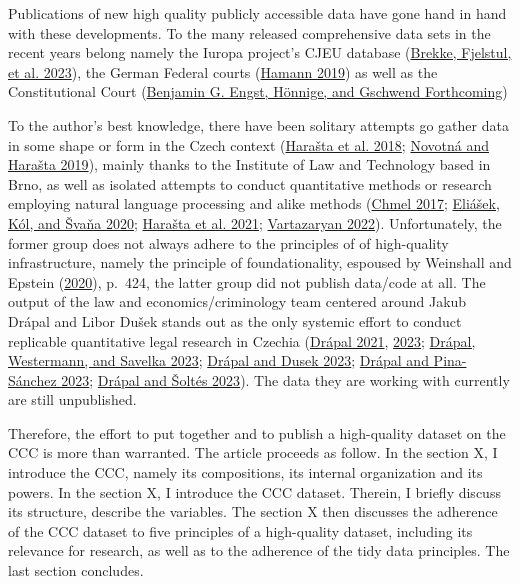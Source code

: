 \documentclass[
  11pt,
]{article}
\begin{document}
Publications of new high quality publicly accessible data have gone hand
in hand with these developments. To the many released comprehensive data
sets in the recent years belong namely the Iuropa project's CJEU
database (\protect\hyperlink{ref-brekkeCJEUDatabasePlatform2023}{Brekke,
Fjelstul, et al. 2023}), the German Federal courts
(\protect\hyperlink{ref-hamannGermanFederalCourts2019}{Hamann 2019}) as
well as the Constitutional Court
(\protect\hyperlink{ref-engstConstitutionalCourtDatabaseForthcoming}{Benjamin
G. Engst, Hönnige, and Gschwend Forthcoming})

To the author's best knowledge, there have been solitary attempts go
gather data in some shape or form in the Czech context
(\protect\hyperlink{ref-harastaAnnotatedCorpusCzech2018}{Harašta et al.
2018}; \protect\hyperlink{ref-novotnaCzechCourtDecisions2019}{Novotná
and Harašta 2019}), mainly thanks to the Institute of Law and Technology
based in Brno, as well as isolated attempts to conduct quantitative
methods or research employing natural language processing and alike
methods (\protect\hyperlink{ref-chmelZpravodajoveSenatyVliv2017}{Chmel
2017};
\protect\hyperlink{ref-eliasekAutomatickaKlasifikaceVyznamovych2020}{Eliášek,
Kól, and Švaňa 2020};
\protect\hyperlink{ref-harastaCitacniAnalyzaJudikatury2021}{Harašta et
al. 2021};
\protect\hyperlink{ref-vartazaryanSitOvaAnalyza2022}{Vartazaryan 2022}).
Unfortunately, the former group does not always adhere to the principles
of of high-quality infrastructure, namely the principle of
foundationality, espoused by Weinshall and Epstein
(\protect\hyperlink{ref-weinshallDevelopingHighQualityData2020}{2020}),
p.~424, the latter group did not publish data/code at all. The output of
the law and economics/criminology team centered around Jakub Drápal and
Libor Dušek stands out as the only systemic effort to conduct replicable
quantitative legal research in Czechia
(\protect\hyperlink{ref-drapalSentencingCzechRepublic2021}{Drápal 2021},
\protect\hyperlink{ref-drapalPunitiveNegligenceMyths2023}{2023};
\protect\hyperlink{ref-drapalUsingLargeLanguage2023}{Drápal, Westermann,
and Savelka 2023};
\protect\hyperlink{ref-drapalLawAuthorityHow2023}{Drápal and Dusek
2023}; \protect\hyperlink{ref-drapalWhatValueJudicial2023}{Drápal and
Pina-Sánchez 2023};
\protect\hyperlink{ref-drapalSentencingDecisionsQuantity2023}{Drápal and
Šoltés 2023}). The data they are working with currently are still
unpublished.

Therefore, the effort to put together and to publish a high-quality
dataset on the CCC is more than warranted. The article proceeds as
follow. In the section X, I introduce the CCC, namely its compositions,
its internal organization and its powers. In the section X, I introduce
the CCC dataset. Therein, I briefly discuss its structure, describe the
variables. The section X then discusses the adherence of the CCC dataset
to five principles of a high-quality dataset, including its relevance
for research, as well as to the adherence of the tidy data principles.
The last section concludes.
\end{document}
